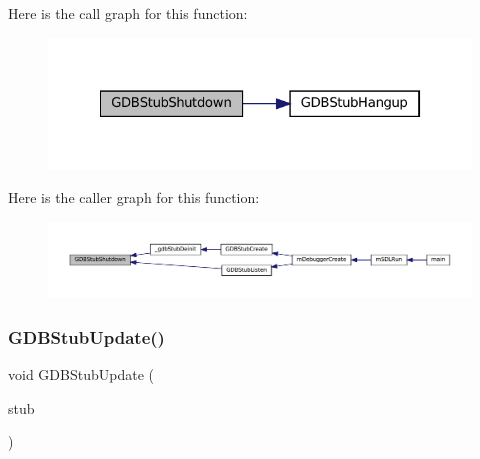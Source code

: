 Here is the call graph for this function\+:
\nopagebreak
\begin{figure}[H]
\begin{center}
\leavevmode
\includegraphics[width=322pt]{gdb-stub_8c_abe19ef8bb5b906d431db62458f3b5c5f_cgraph}
\end{center}
\end{figure}
Here is the caller graph for this function\+:
\nopagebreak
\begin{figure}[H]
\begin{center}
\leavevmode
\includegraphics[width=350pt]{gdb-stub_8c_abe19ef8bb5b906d431db62458f3b5c5f_icgraph}
\end{center}
\end{figure}
\mbox{\label{gdb-stub_8c_a258a1ad74baac2ecfadeab0d1e07e3b0}} 
\subsubsection{\texorpdfstring{G\+D\+B\+Stub\+Update()}{GDBStubUpdate()}}
{\footnotesize\ttfamily void G\+D\+B\+Stub\+Update (\begin{DoxyParamCaption}\item[{struct G\+D\+B\+Stub $\ast$}]{stub }\end{DoxyParamCaption})}


